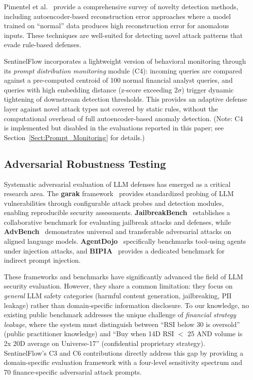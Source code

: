 \documentclass[journal]{IEEEtran}
\begin{document}
Pimentel et al.~\cite{pimentel_novelty} provide a comprehensive survey of novelty detection methods, including autoencoder-based reconstruction error approaches where a model trained on ``normal'' data produces high reconstruction error for anomalous inputs. These techniques are well-suited for detecting novel attack patterns that evade rule-based defenses.

SentinelFlow incorporates a lightweight version of behavioral monitoring through its \textit{prompt distribution monitoring} module (C4): incoming queries are compared against a pre-computed centroid of 100 normal financial analyst queries, and queries with high embedding distance (z-score exceeding $2\sigma$) trigger dynamic tightening of downstream detection thresholds. This provides an adaptive defense layer against novel attack types not covered by static rules, without the computational overhead of full autoencoder-based anomaly detection. (Note: C4 is implemented but disabled in the evaluations reported in this paper; see Section~\ref{Sect:Prompt_Monitoring} for details.)

\subsection{Adversarial Robustness Testing}
\label{Sect:LR_Adversarial}

Systematic adversarial evaluation of LLM defenses has emerged as a critical research area. The \textbf{garak} framework~\cite{garak_paper, garak_github} provides standardized probing of LLM vulnerabilities through configurable attack probes and detection modules, enabling reproducible security assessments. \textbf{JailbreakBench}~\cite{jailbreakbench} establishes a collaborative benchmark for evaluating jailbreak attacks and defenses, while \textbf{AdvBench}~\cite{advbench} demonstrates universal and transferable adversarial attacks on aligned language models. \textbf{AgentDojo}~\cite{agentdojo} specifically benchmarks tool-using agents under injection attacks, and \textbf{BIPIA}~\cite{bipia} provides a dedicated benchmark for indirect prompt injection.

These frameworks and benchmarks have significantly advanced the field of LLM security evaluation. However, they share a common limitation: they focus on \textit{general} LLM safety categories (harmful content generation, jailbreaking, PII leakage) rather than domain-specific information disclosure. To our knowledge, no existing public benchmark addresses the unique challenge of \textit{financial strategy leakage}, where the system must distinguish between ``RSI below 30 is oversold'' (public practitioner knowledge) and ``Buy when 14D RSI $<$ 25 AND volume is 2x 20D average on Universe-17'' (confidential proprietary strategy). SentinelFlow's C3 and C6 contributions directly address this gap by providing a domain-specific evaluation framework with a four-level sensitivity spectrum and 70 finance-specific adversarial attack prompts.
\end{document}

